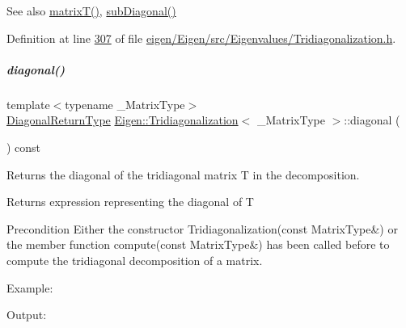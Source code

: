 \begin{DoxySeeAlso}{See also}
\hyperlink{group___eigenvalues___module_a6eb5ef94b8b9bb013c0e69b6df56d0df}{matrix\+T()}, \hyperlink{group___eigenvalues___module_ac423dbb91157c159bdcb4b5a8371232e}{sub\+Diagonal()} 
\end{DoxySeeAlso}


Definition at line \hyperlink{eigen_2_eigen_2src_2_eigenvalues_2_tridiagonalization_8h_source_l00307}{307} of file \hyperlink{eigen_2_eigen_2src_2_eigenvalues_2_tridiagonalization_8h_source}{eigen/\+Eigen/src/\+Eigenvalues/\+Tridiagonalization.\+h}.

\mbox{\label{group___eigenvalues___module_a73e246e30a97206ce0c717db98b06c41}} 
\subparagraph{\texorpdfstring{diagonal()}{diagonal()}\hspace{0.1cm}{\footnotesize\ttfamily [2/2]}}
{\footnotesize\ttfamily template$<$typename \+\_\+\+Matrix\+Type$>$ \\
\hyperlink{class_eigen_1_1internal_1_1_tensor_lazy_evaluator_writable}{Diagonal\+Return\+Type} \hyperlink{group___eigenvalues___module_class_eigen_1_1_tridiagonalization}{Eigen\+::\+Tridiagonalization}$<$ \+\_\+\+Matrix\+Type $>$\+::diagonal (\begin{DoxyParamCaption}{ }\end{DoxyParamCaption}) const}



Returns the diagonal of the tridiagonal matrix T in the decomposition. 

\begin{DoxyReturn}{Returns}
expression representing the diagonal of T
\end{DoxyReturn}
\begin{DoxyPrecond}{Precondition}
Either the constructor Tridiagonalization(const Matrix\+Type\&) or the member function compute(const Matrix\+Type\&) has been called before to compute the tridiagonal decomposition of a matrix.
\end{DoxyPrecond}
Example\+: 
\begin{DoxyCodeInclude}
\end{DoxyCodeInclude}
 Output\+: 
\begin{DoxyVerbInclude}
\end{DoxyVerbInclude}


